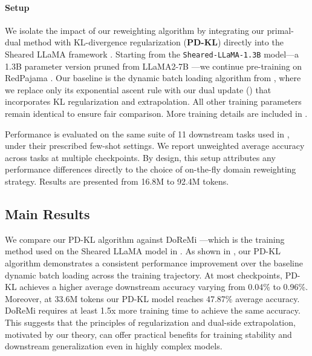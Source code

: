 \documentclass[11pt]{article}
\newcounter{thm}
\numberwithin{thm}{section}
\theoremstyle{plain}
\theoremstyle{definition}
\theoremstyle{remark} \newtheorem{remark}[thm]{Remark}
\begin{document}
\paragraph{Setup}
We isolate the impact of our reweighting algorithm by integrating our primal-dual method with KL-divergence regularization (\textbf{PD-KL}) directly into the Sheared LLaMA framework \citep{xia2024shearedllamaacceleratinglanguage}. Starting from the \texttt{Sheared-LLaMA-1.3B} model—a 1.3B parameter version pruned from LLaMA2-7B \citep{xia2024shearedllamaacceleratinglanguage}—we continue pre-training on RedPajama \citep{together2023redpajama}. Our baseline is the dynamic batch loading algorithm from \citep{xia2024shearedllamaacceleratinglanguage}, where we replace only its exponential ascent rule with our dual update () that incorporates KL regularization and extrapolation. All other training parameters remain identical to ensure fair comparison. More training details are included in .

Performance is evaluated on the same suite of 11 downstream tasks used in \citep[Table 2]{xia2024shearedllamaacceleratinglanguage}, under their prescribed few-shot settings. We report unweighted average accuracy across tasks at multiple checkpoints. By design, this setup attributes any performance differences directly to the choice of on-the-fly domain reweighting strategy. Results are presented from 16.8M to 92.4M tokens. 

\subsection{Main Results}

We compare our PD-KL algorithm against DoReMi \citep{xie2023doremi}---which is the training method used on the Sheared LLaMA model in \citep{xia2024shearedllamaacceleratinglanguage}.
As shown in , our PD-KL algorithm demonstrates a consistent performance improvement over the baseline dynamic batch loading across the training trajectory. At most checkpoints, PD-KL achieves a higher average downstream accuracy varying from 0.04\% to 0.96\%. Moreover, at 33.6M tokens our PD-KL model reaches 47.87\% average accuracy. DoReMi requires at least 1.5x more training time to achieve the same accuracy. This suggests that the principles of regularization and dual-side extrapolation, motivated by our theory, can offer practical benefits for training stability and downstream generalization even in highly complex models.
\end{document}
